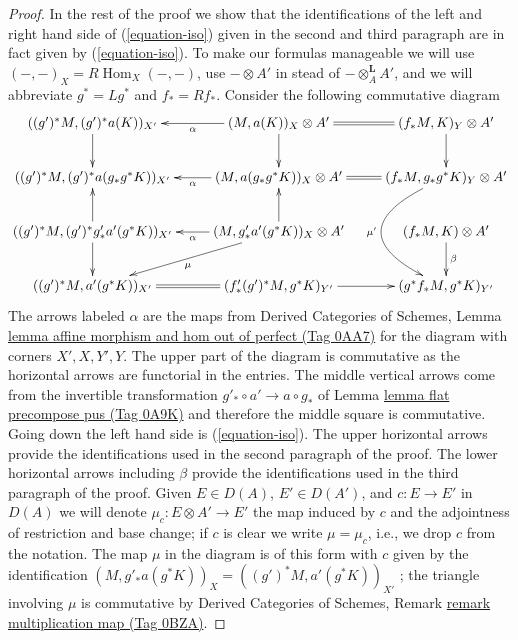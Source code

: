 \documentclass{amsart}
\theoremstyle{plain}
\theoremstyle{definition}
\theoremstyle{remark}
\numberwithin{equation}{subsection}
\def\Hom{\mathop{\mathrm{Hom}}\nolimits}
\begin{document}
\begin{proof}
\medskip\noindent
In the rest of the proof we show that the identifications of
the left and right hand side of (\ref{equation-iso})
given in the second and third paragraph are in fact given by
(\ref{equation-iso}). To make our formulas manageable
we will use $(-, -)_X = R\Hom_X(-, -)$, use $- \otimes A'$
in stead of $- \otimes_A^\mathbf{L} A'$, and we will abbreviate
$g^* = Lg^*$ and $f_* = Rf_*$. Consider the following
commutative diagram
$$
\xymatrix{
((g')^*M, (g')^*a(K))_{X'} \ar[d] &
(M, a(K))_X \otimes A' \ar[l]^-\alpha \ar[d] &
(f_*M, K)_Y \otimes A' \ar@{=}[l] \ar[d] \\
((g')^*M, (g')^*a(g_*g^*K))_{X'} &
(M, a(g_*g^*K))_X \otimes A' \ar[l]^-\alpha &
(f_*M, g_*g^*K)_Y \otimes A' \ar@{=}[l] \ar@/_4pc/[dd]_{\mu'} \\
((g')^*M, (g')^*g'_*a'(g^*K))_{X'} \ar[u] \ar[d] &
(M, g'_*a'(g^*K))_X \otimes A' \ar[u] \ar[l]^-\alpha \ar[ld]^\mu &
(f_*M, K) \otimes A' \ar[d]^\beta \\
((g')^*M, a'(g^*K))_{X'} &
(f'_*(g')^*M, g^*K)_{Y'} \ar@{=}[l] \ar[r] &
(g^*f_*M, g^*K)_{Y'}
}
$$
The arrows labeled $\alpha$ are the maps from
Derived Categories of Schemes, Lemma
\href{https://stacks.math.columbia.edu/tag/0AA7}{lemma affine morphism and hom out of perfect (Tag 0AA7)}
for the diagram with corners $X', X, Y', Y$.
The upper part of the diagram is commutative as the horizontal arrows are
functorial in the entries.
The middle vertical arrows come from the invertible transformation
$g'_* \circ a' \to a \circ g_*$  of Lemma \href{https://stacks.math.columbia.edu/tag/0A9K}{lemma flat precompose pus (Tag 0A9K)}
and therefore the middle square is commutative.
Going down the left hand side is (\ref{equation-iso}).
The upper horizontal arrows provide the identifications used in the
second paragraph of the proof.
The lower horizontal arrows including $\beta$ provide the identifications
used in the third paragraph of the proof. Given $E \in D(A)$,
$E' \in D(A')$, and $c : E \to E'$ in $D(A)$ we will denote
$\mu_c : E \otimes A' \to E'$ the map induced by $c$
and the adjointness of restriction and base change;
if $c$ is clear we write $\mu = \mu_c$, i.e., we
drop $c$ from the notation. The map $\mu$ in the diagram is of this
form with $c$ given by the identification
$(M, g'_*a(g^*K))_X = ((g')^*M, a'(g^*K))_{X'}$
; the triangle involving $\mu$ is commutative by
Derived Categories of Schemes, Remark \href{https://stacks.math.columbia.edu/tag/0BZA}{remark multiplication map (Tag 0BZA)}.


\end{proof}
\end{document}
